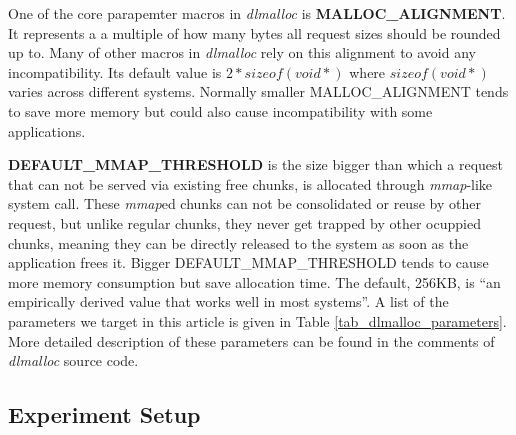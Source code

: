 One of the core parapemter macros in \emph{dlmalloc}  is \textbf{MALLOC\_ALIGNMENT}. It represents a a multiple of how many bytes all request sizes should be rounded up to. Many of other macros in \emph{dlmalloc} rely on this alignment to avoid any incompatibility. Its default value is $2*sizeof(void*)$ where $sizeof(void*)$ varies across different systems. Normally smaller MALLOC\_ALIGNMENT tends to save more memory but could also cause incompatibility with some applications. 



\textbf{DEFAULT\_MMAP\_THRESHOLD} is the size bigger than which a request that can not be served via existing free chunks, is allocated through \emph{mmap}-like system call. These \emph{mmap}ed chunks can not be consolidated or reuse by other request, but unlike regular chunks, they never get trapped by other ocuppied chunks, meaning they can be directly released to the system as soon as the application frees it. Bigger DEFAULT\_MMAP\_THRESHOLD tends to cause more memory consumption but save allocation time. The default, 256KB, is ``an empirically derived value that works well in most systems''. A list of the parameters we target in this article is given in Table \ref{tab_dlmalloc_parameters}. More detailed description of these parameters can be found in the comments of \emph{dlmalloc} source code.


\subsection{Experiment Setup}


\begin{table}[htbp]
\centering
\caption{Subject applications}
\label{tab_sub_app}
\end{table}

